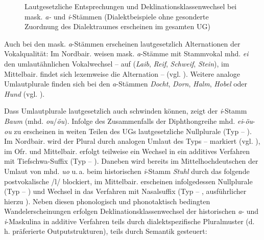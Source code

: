 \begin{figure}[H]
{}
\caption{Lautgesetzliche Entsprechungen und Deklinationsklassenwechsel bei mask. \textit{a-} und \textit{i}{}-Stämmen (Dialektbeispiele ohne gesonderte Zuordnung des Dialektraumes erscheinen im gesamten UG)}
\label{fig:12}
\end{figure}
\vfill\pagebreak

Auch bei den mask. \textit{a}{}-Stämmen erscheinen lautgesetzlich Alternationen der Vokalqualität: Im Nordbair. weisen mask. \textit{a}{}-Stämme mit Stammvokal mhd. \textit{ei} den umlautähnlichen Vokalwechsel  --  auf (\textit{Laib}, \textit{Reif}, \textit{Schweif}, \textit{Stein}), im Mittelbair. findet sich lexemweise die Alternation  --  (vgl. ). Weitere analoge Umlautplurale finden sich bei den \textit{a}{}-Stämmen \textit{Docht}, \textit{Dorn}, \textit{Halm}, \textit{Hobel} oder \textit{Hund} (vgl. \citealt[§796]{Schmeller1821}).

Dass Umlautplurale lautgesetzlich auch schwinden können, zeigt der \textit{i}{}-Stamm \textit{Baum} (mhd. \textit{ou}/\textit{öu}). Infolge des Zusammenfalls der Diphthongreihe mhd. \textit{ei}{}-\textit{öu}{}-\textit{ou} zu  erscheinen in weiten Teilen des UGs lautgesetzliche Nullplurale (Typ  -- ). Im Nordbair. wird der Plural durch analogen Umlaut des Typs   --  markiert (vgl. ), im Ofr. und Mittelbair. erfolgt teilweise ein Wechsel in ein additives Verfahren mit Tiefschwa-Suffix (Typ  -- ). Daneben wird bereits im Mittelhochdeutschen der Umlaut von mhd. \textit{uo} u.\,a. beim historischen \textit{i}{}-Stamm \textit{Stuhl} durch das folgende postvokalische /l/ blockiert, im Mittelbair. erscheinen infolgedessen Nullplurale (Typ  -- ) und Wechsel in das Verfahren mit Nasalsuffix (Typ  -- , ausführlicher hierzu ). Neben diesen phonologisch und phonotaktisch bedingten Wandelerscheinungen erfolgen Deklinationsklassenwechsel der historischen \textit{a}{}- und \textit{i}{}-Maskulina in additive Verfahren teils durch dialektspezifische Pluralmuster (d.\,h. präferierte Outputstrukturen), teils durch Semantik gesteuert:

